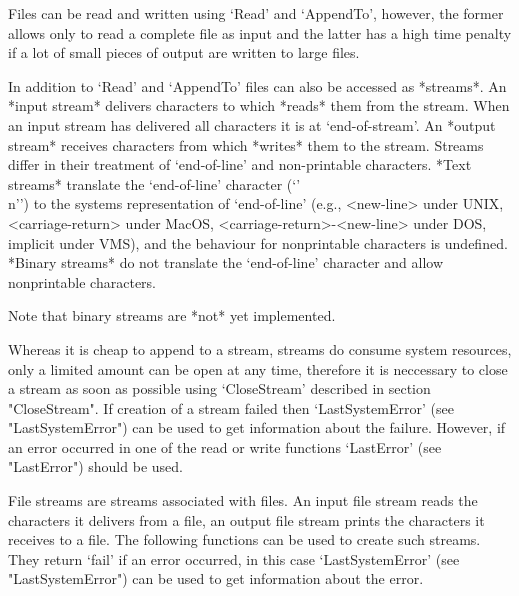 


Files can be read and  written using `Read'  and `AppendTo', however, the
former allows only to read a complete file as {\GAP} input and the latter
has a high time penalty if a lot of small pieces of output are written to
large files.

In addition  to  `Read'  and `AppendTo'  files  can  also be  accessed as
*streams*.  An *input stream* delivers characters to {\GAP} which *reads*
them from the stream.  When an  input stream has delivered all characters
it is  at `end-of-stream'.  An  *output  stream* receives characters from
{\GAP} which *writes* them   to  the stream.    Streams differ in   their
treatment of `end-of-line' and  non-printable characters.  *Text streams*
translate the `end-of-line'     character (`{'\\n'}')  to  the    systems
representation   of   `end-of-line'   (e.g.,    <new-line>  under   UNIX,
<carriage-return> under  MacOS,  <carriage-return>-<new-line> under  DOS,
implicit under VMS), and  the behaviour  for nonprintable characters   is
undefined.  *Binary streams* do not translate the `end-of-line' character
and allow nonprintable characters.

Note that binary streams are *not* yet implemented.

Whereas it   is cheap to append  to  a stream, streams  do consume system
resources, only a limited amount can be open at any time, therefore it is
neccessary  to  close a stream   as soon as possible  using `CloseStream'
described in section "CloseStream".  If  creation of a stream failed then
`LastSystemError' (see "LastSystemError") can  be used to get information
about the failure.  However,  if an error occurred  in one of the read or
write functions `LastError' (see "LastError") should be used.


File streams  are  streams associated with  files.  An  input file stream
reads  the characters  it delivers from  a  file,  an output  file stream
prints the characters it receives to a file.  The following functions can
be used to create such streams.  They return `fail' if an error occurred,
in this case `LastSystemError' (see "LastSystemError") can be used to get
information about the error.

